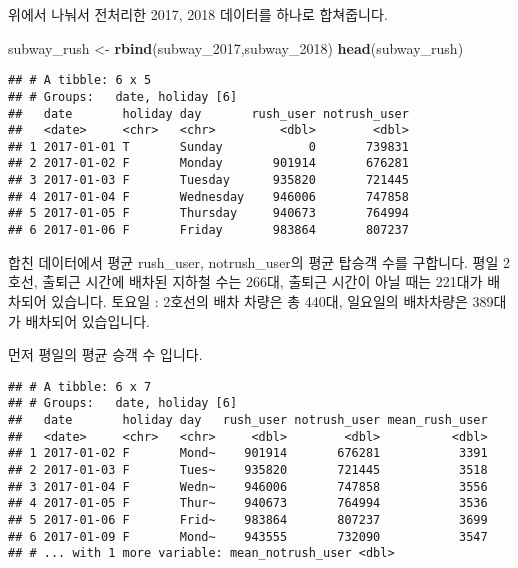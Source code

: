 \documentclass[]{article}
\newenvironment{Shaded}{\begin{snugshade}}{\end{snugshade}}
\newcommand{\KeywordTok}[1]{\textcolor[rgb]{0.13,0.29,0.53}{\textbf{#1}}}
\newcommand{\DataTypeTok}[1]{\textcolor[rgb]{0.13,0.29,0.53}{#1}}
\newcommand{\DecValTok}[1]{\textcolor[rgb]{0.00,0.00,0.81}{#1}}
\newcommand{\StringTok}[1]{\textcolor[rgb]{0.31,0.60,0.02}{#1}}
\newcommand{\OperatorTok}[1]{\textcolor[rgb]{0.81,0.36,0.00}{\textbf{#1}}}
\newcommand{\NormalTok}[1]{#1}
\begin{document}
위에서 나눠서 전처리한 2017, 2018 데이터를 하나로 합쳐줍니다.

\begin{Shaded}
\begin{Highlighting}[]
\NormalTok{subway_rush <-}\StringTok{ }\KeywordTok{rbind}\NormalTok{(subway_}\DecValTok{2017}\NormalTok{,subway_}\DecValTok{2018}\NormalTok{)}
\KeywordTok{head}\NormalTok{(subway_rush)}
\end{Highlighting}
\end{Shaded}

\begin{verbatim}
## # A tibble: 6 x 5
## # Groups:   date, holiday [6]
##   date       holiday day       rush_user notrush_user
##   <date>     <chr>   <chr>         <dbl>        <dbl>
## 1 2017-01-01 T       Sunday            0       739831
## 2 2017-01-02 F       Monday       901914       676281
## 3 2017-01-03 F       Tuesday      935820       721445
## 4 2017-01-04 F       Wednesday    946006       747858
## 5 2017-01-05 F       Thursday     940673       764994
## 6 2017-01-06 F       Friday       983864       807237
\end{verbatim}

합친 데이터에서 평균 rush\_user, notrush\_user의 평균 탑승객 수를
구합니다. 평일 2호선, 출퇴근 시간에 배차된 지하철 수는 266대, 출퇴근
시간이 아닐 때는 221대가 배차되어 있습니다. 토요일 : 2호선의 배차 차량은
총 440대, 일요일의 배차차량은 389대가 배차되어 있습입니다.

먼저 평일의 평균 승객 수 입니다.

\begin{Shaded}
\end{Shaded}

\begin{verbatim}
## # A tibble: 6 x 7
## # Groups:   date, holiday [6]
##   date       holiday day   rush_user notrush_user mean_rush_user
##   <date>     <chr>   <chr>     <dbl>        <dbl>          <dbl>
## 1 2017-01-02 F       Mond~    901914       676281           3391
## 2 2017-01-03 F       Tues~    935820       721445           3518
## 3 2017-01-04 F       Wedn~    946006       747858           3556
## 4 2017-01-05 F       Thur~    940673       764994           3536
## 5 2017-01-06 F       Frid~    983864       807237           3699
## 6 2017-01-09 F       Mond~    943555       732090           3547
## # ... with 1 more variable: mean_notrush_user <dbl>
\end{verbatim}
\end{document}
